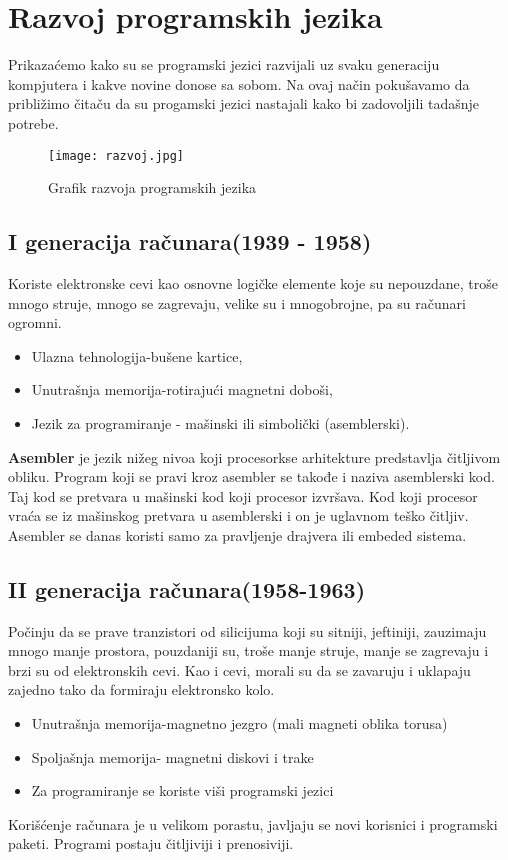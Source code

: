 \documentclass[a4paper]{article}
\begin{document}
\section{Razvoj programskih jezika}

Prikazaćemo kako su se programski jezici razvijali uz svaku generaciju kompjutera i kakve novine donose sa sobom. Na ovaj način pokušavamo da približimo čitaču da su progamski jezici nastajali kako bi zadovoljili tadašnje potrebe.

\begin{figure}[h!]
\begin{center}
 \texttt{[image: razvoj.jpg]}
\caption{Grafik razvoja programskih jezika}
\label{fig:grafik}
\end{center}
\end{figure}

\newpage
\subsection{I generacija računara(1939 - 1958)}  

Koriste elektronske cevi kao osnovne logičke elemente koje su nepouzdane, troše mnogo struje, mnogo se zagrevaju, velike su i mnogobrojne, pa su računari ogromni. 

\begin{itemize}[noitemsep]
\item Ulazna tehnologija-bušene kartice, 
\item Unutrašnja memorija-rotirajući magnetni doboši,
\item Jezik za programiranje - mašinski ili simbolički (asemblerski).
\end{itemize}

\textbf{Asembler} je jezik nižeg nivoa koji procesorkse arhitekture predstavlja čitljivom obliku. Program koji se pravi kroz asembler se takođe i naziva asemblerski kod. Taj kod se pretvara u mašinski kod koji procesor izvršava. Kod koji procesor vraća se iz mašinskog pretvara u asemblerski i on je uglavnom teško čitljiv. Asembler se danas koristi samo za pravljenje drajvera ili embeded sistema.

\subsection{II generacija računara(1958-1963)}

Počinju da se prave tranzistori od silicijuma koji su sitniji, jeftiniji, zauzimaju
mnogo manje prostora, pouzdaniji su, troše manje struje, manje se zagrevaju i brzi su od elektronskih cevi. Kao i cevi, morali su da se zavaruju i uklapaju
zajedno tako da formiraju elektronsko kolo.
\begin{itemize}[noitemsep]
\item Unutrašnja memorija-magnetno jezgro (mali magneti oblika
torusa)
\item Spoljašnja memorija- magnetni diskovi i trake
\item Za programiranje se koriste viši programski jezici
\end{itemize}
Korišćenje računara je u velikom porastu, javljaju se novi korisnici i programski paketi. Programi postaju čitljiviji i prenosiviji.
\end{document}
